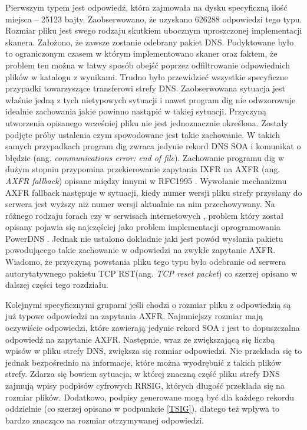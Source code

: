 Pierwszym typem jest odpowiedź, która zajmowała na dysku specyficzną ilość miejsca -- 25123 bajty. Zaobserwowano, że uzyskano
626288 odpowiedzi tego typu. Rozmiar pliku jest swego rodzaju skutkiem ubocznym uproszczonej implementacji skanera. Założono,
że zawsze zostanie odebrany pakiet DNS. Podyktowane było to ograniczonym czasem w którym implementowano skaner
oraz faktem, że problem ten można w łatwy sposób obejść poprzez odfiltrowanie odpowiednich plików w katalogu z wynikami.
Trudno było przewidzieć wszystkie specyficzne przypadki towarzyszące transferowi strefy DNS. Zaobserwowana sytuacja jest właśnie
jedną z tych nietypowych sytuacji i nawet program dig nie odwzorowuje idealnie zachowania jakie powinno nastąpić w takiej sytuacji.
Przyczyną utworzenia opisanego wcześniej pliku nie jest jednoznacznie określona. Zostały podjęte próby ustalenia czym spowodowane
	jest takie zachowanie. W takich samych przypadkach program dig zwraca jedynie rekord DNS SOA i komunikat o błędzie (ang.
\textit{communications error: end of file}). Zachowanie programu dig w dużym stopniu przypomina przekierowanie zapytania IXFR na
AXFR (ang. \textit{AXFR fallback}) opisane między innymi w RFC1995 \cite{RFC1995}. Wywołanie mechanizmu AXFR fallback następuje
w sytuacji, kiedy numer wersji pliku strefy przysłany do serwera jest wyższy niż numer wersji aktualnie na nim przechowywany.
Na różnego rodzaju forach \cite{powerdns-forum} czy w serwisach internetowych \cite{powerdns-git}, problem który został opisany
pojawia się najczęściej jako problem implementacji oprogramowania PowerDNS \cite{powerdns}. Jednak nie ustalono dokładnie
jaki jest powód wysłania pakietu powodującego takie zachowanie w odpowiedzi na zwykłe zapytanie AXFR. Wiadomo, że przyczyną powstania
pliku tego typu było odebranie od serwera autorytatywnego pakietu
TCP RST(ang. \textit{TCP reset packet}) co szerzej opisano w dalszej części tego rozdziału.

Kolejnymi specyficznymi grupami jeśli chodzi o rozmiar pliku z odpowiedzią są już typowe odpowiedzi na zapytania AXFR.
Najmniejszy rozmiar mają oczywiście odpowiedzi, które zawierają jedynie rekord SOA i jest to dopuszczalna odpowiedź na zapytanie
AXFR. Następnie, wraz ze zwiększającą się liczbą wpisów w pliku strefy DNS, zwiększa się rozmiar odpowiedzi. Nie przekłada się to
jednak bezpośrednio na informacje, które można wyodrębnić z takich plików strefy. Zdarza się bowiem sytuacja, w której znaczną część
pliku strefy DNS zajmują wpisy podpisów cyfrowych RRSIG, których długość przekłada się na rozmiar plików. Dodatkowo, podpisy
generowane mogą być dla każdego rekordu oddzielnie (co szerzej opisano w podpunkcie \ref{TSIG}), dlatego też wpływa to bardzo
znacząco na rozmiar otrzymywanej odpowiedzi.

